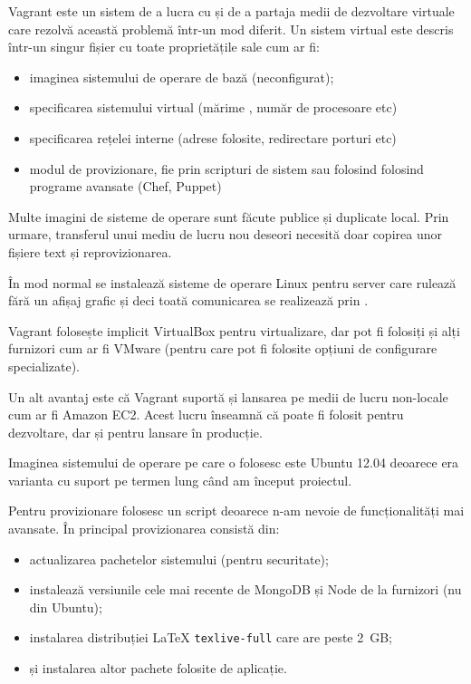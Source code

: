 \documentclass[a4wide,12pt]{report}
\newcommand{\cod}[1]{\texttt{#1}}
\newcommand{\acr}[1]{{\textsmaller[1]{\textsc{#1}}}} %
\begin{document}
Vagrant este un sistem de a lucra cu și de a partaja medii de dezvoltare
virtuale care rezolvă această problemă într-un mod diferit. Un sistem virtual
este descris într-un singur fișier cu toate proprietățile sale cum ar fi:

\begin{itemize}

\item imaginea sistemului de operare de bază (neconfigurat);

\item specificarea sistemului virtual (mărime \acr{RAM}, număr de procesoare
etc)

\item specificarea rețelei interne (adrese \acr{IP} folosite, redirectare
porturi etc)

\item modul de provizionare, fie prin scripturi de sistem sau folosind folosind
programe avansate (Chef, Puppet)

\end{itemize}

Multe imagini de sisteme de operare sunt făcute publice și duplicate local. Prin
urmare, transferul unui mediu de lucru nou deseori necesită doar copirea unor
fișiere text și reprovizionarea.

În mod normal se instalează sisteme de operare Linux pentru server care rulează
fără un afișaj grafic și deci toată comunicarea se realizează prin \acr{SSH}.

Vagrant folosește implicit VirtualBox pentru virtualizare, dar pot fi folosiți
și alți furnizori cum ar fi VMware (pentru care pot fi folosite opțiuni de
configurare specializate).

Un alt avantaj este că Vagrant suportă și lansarea pe medii de lucru non-locale
cum ar fi Amazon EC2. Acest lucru înseamnă că poate fi folosit pentru
dezvoltare, dar și pentru lansare în producție.

Imaginea sistemului de operare pe care o folosesc este Ubuntu 12.04 deoarece era
varianta cu suport pe termen lung când am început proiectul.

Pentru provizionare folosesc un script deoarece n-am nevoie de funcționalități
mai avansate. În principal provizionarea consistă din:

\begin{itemize}

\item actualizarea pachetelor sistemului (pentru securitate);

\item instalează versiunile cele mai recente de MongoDB și Node de la furnizori
(nu din Ubuntu);

\item instalarea distribuției \LaTeX{} \cod{texlive-full} care are peste 2~GB;

\item și instalarea altor pachete folosite de aplicație.

\end{itemize}
\end{document}
